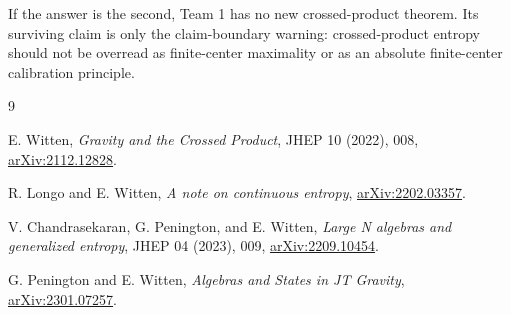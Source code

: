 \documentclass[12pt]{article}
\theoremstyle{remark}
\begin{document}
If the answer is the second, Team 1 has no new crossed-product theorem.  Its
surviving claim is only the claim-boundary warning: crossed-product entropy
should not be overread as finite-center maximality or as an absolute
finite-center calibration principle.

\begin{thebibliography}{9}

E. Witten,
\emph{Gravity and the Crossed Product},
JHEP 10 (2022), 008,
\href{https://arxiv.org/abs/2112.12828}{arXiv:2112.12828}.

R. Longo and E. Witten,
\emph{A note on continuous entropy},
\href{https://arxiv.org/abs/2202.03357}{arXiv:2202.03357}.

V. Chandrasekaran, G. Penington, and E. Witten,
\emph{Large N algebras and generalized entropy},
JHEP 04 (2023), 009,
\href{https://arxiv.org/abs/2209.10454}{arXiv:2209.10454}.

G. Penington and E. Witten,
\emph{Algebras and States in JT Gravity},
\href{https://arxiv.org/abs/2301.07257}{arXiv:2301.07257}.

\end{thebibliography}
\end{document}
